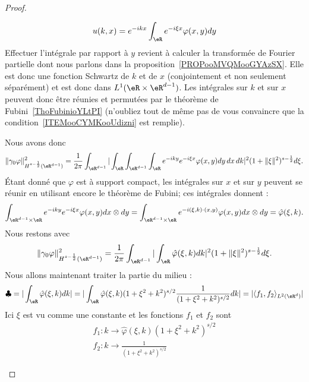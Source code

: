\begin{proof}
\begin{subproof}
\begin{equation}
			u(k,x)= e^{-ikx}\int_{\eR} e^{-i\xi x}\varphi(x,y)dy
		\end{equation}
		Effectuer l'intégrale par rapport à \( y\) revient à calculer la transformée de Fourier partielle dont nous parlons dans la proposition~\ref{PROPooMVQMooGYAzSX}. Elle est donc une fonction Schwartz de \( k\) et de \( x\) (conjointement et non seulement séparément) et est donc dans \( L^1(\eR\times \eR^{d-1})\). Les intégrales sur \( k \) et sur \( x\) peuvent donc être réunies et permutées par le théorème de Fubini~\ref{ThoFubinioYLtPI} (n'oubliez tout de même pas de vous convaincre que la condition~\ref{ITEMooCYMKooUdizni} est remplie).

		Nous avons donc
		\begin{equation}
			\| \gamma_0\varphi \|^2_{H^{s-\frac{ 1 }{2}}(\eR^{d-1})}=\frac{1}{ 2\pi }\int_{\eR^{d-1}}|\int_{\eR}\int_{\eR^{d-1}}\int_{\eR} e^{-iky} e^{-i\xi x}\varphi(x,y)dy\,dx\,dk|^2(1+\| \xi \|^2)^{s-\frac{ 1 }{2}}d\xi.
		\end{equation}
		Étant donné que \( \varphi\) est à support compact, les intégrales sur \( x\) et sur \( y\) peuvent se réunir en utilisant encore le théorème de Fubini; ces intégrales donnent :
		\begin{equation}
			\int_{\eR^{d-1}\times \eR} e^{-iky} e^{-i\xi x}\varphi(x,y)dx\otimes dy=\int_{\eR^{d-1}\times \eR} e^{  -i(\xi,k)\cdot(x,y)  }\varphi(x,y)dx\otimes dy=\hat \varphi(\xi,k).
		\end{equation}
		Nous restons avec
		\begin{equation}
			\| \gamma_0\varphi \|^2_{H^{s-\frac{ 1 }{2}}(\eR^{d-1})}=\frac{1}{ 2\pi }\int_{\eR^{d-1}}|   \int_{\eR}\hat \varphi(\xi,k)dk    |^2(1+\| \xi \|^2)^{s-\frac{ 1 }{2}}d\xi.
		\end{equation}
		Nous allons maintenant traiter la partie du milieu :
		\begin{equation}
			\clubsuit=|\int_{\eR}\hat \varphi(\xi,k)dk|=| \int_{\eR}\hat \varphi(\xi,k)(1+\xi^2+k^2)^{s/2}\frac{1}{ (1+\xi^2+k^2)^{s/2} }dk |=| \langle f_1, f_2\rangle_{L^2(\eR^d)} |
		\end{equation}
		Ici \( \xi\) est vu comme une constante et les fonctions \( f_1\) et \( f_2\) sont
		\begin{subequations}
			\begin{align}
				f_1\colon k\to \hat \varphi(\xi,k)(1+\xi^2+k^2)^{s/2} \\
				f_2\colon k\to \frac{1}{ (1+\xi^2+k^2)^{s/2} }

\end{align}
\end{subequations}
\end{subproof}
\end{proof}
